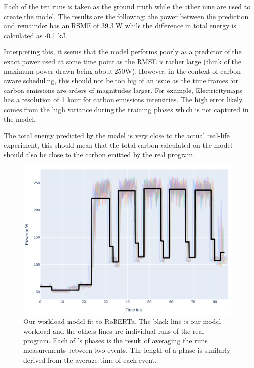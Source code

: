 Each of the ten runs is taken as the ground truth while the other nine are used to create the model. 
The results are the following: the power between the prediction and remainder has an RSME of 39.3 W while the difference in total energy is calculated as -0.1 kJ. 

Interpreting this, it seems that the model performs poorly as a predictor of the exact power used at some time point as the RMSE is rather large (think of the maximum power drawn being about 250W). 
However, in the context of carbon-aware scheduling, this should not be too big of an issue as the time frames for carbon emissions are orders of magnitudes larger. 
For example, Electricitymaps has a resolution of 1 hour for carbon emissions intensities. 
The high error likely comes from the high variance during the training phases which is not captured in the model.

The total energy predicted by the model is very close to the actual real-life experiment, this should mean that the total carbon calculated on the model should also be close to the carbon emitted by the real program.

\begin{figure}
    \includegraphics[width=\linewidth]{power-measurements/model_overlaid.pdf}
    \caption{Our \modelname{} workload model fit to RoBERTa. The black line is our model workload and the others lines are individual runs of the real program. Each of \modelname{}'s phases is the result of averaging the runs measurements between two events. The length of a phase is similarly derived from the average time of each event.}
    \label{fig:model_overlaid}
\end{figure}
